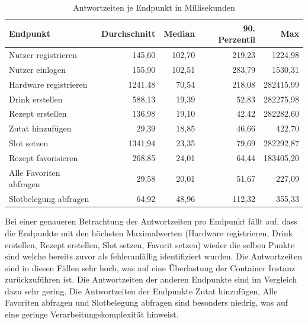 \begin{table}[H] 
    \centering
        \begin{tabular}{|l|r|r|r|r|}
            \hline
            \textbf{Endpunkt} &
            \textbf{Durchschnitt} & 
            \textbf{Median} & 
            \textbf{90. Perzentil} & 
            \textbf{Max} \\
            \hline
            Nutzer registrieren     &  145,60 & 102,70 & 219,23 &   1224,98 \\
            Nutzer einlogen         &  155,90 & 102,51 & 283,79 &   1530,31 \\
            Hardware registrieren   & 1241,48 &  70,54 & 218,08 & 282415,99 \\
            Drink erstellen         &  588,13 &  19,39 &  52,83 & 282275,98 \\
            Rezept erstellen        &  136,98 &  19,10 &  42,42 & 282282,60 \\
            Zutat hinzufügen        &   29,39 &  18,85 &  46,66 &    422,70 \\
            Slot setzen             & 1341,94 &  23,35 &  79,69 & 282292,87 \\
            Rezept favorisieren     &  268,85 &  24,01 &  64,44 & 183405,20 \\
            Alle Favoriten abfragen &   29,58 &  20,01 &  51,67 &    227,09 \\
            Slotbelegung abfragen   &   64,92 &  48,96 & 112,32 &    355,33 \\
            \hline
        \end{tabular}
    \caption{Antwortzeiten je Endpunkt in Millisekunden}
    \label{tab:response_times}
\end{table}

Bei einer genaueren Betrachtung der Antwortzeiten pro Endpunkt fällt auf, dass die Endpunkte mit 
den höchsten Maximalwerten (Hardware registrieren, Drink erstellen, Rezept erstellen, Slot setzen, 
Favorit setzen) wieder die selben Punkte sind welche bereits zuvor als fehleranfällig identifiziert
wurden. Die Antwortzeiten sind in diesen Fällen sehr hoch, was auf eine Überlastung der Container 
Instanz zurückzuführen ist. Die Antwortzeiten der anderen Endpunkte sind im Vergleich dazu sehr
gering. Die Antwortzeiten der Endpunkte Zutat hinzufügen, Alle Favoriten abfragen und Slotbelegung
abfragen sind besonders niedrig, was auf eine geringe Verarbeitungskomplexität hinweist.

